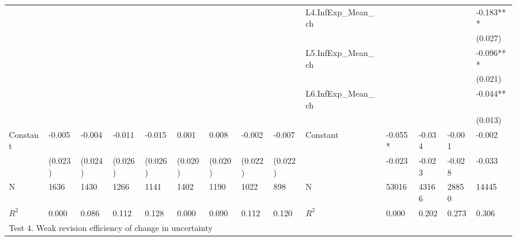\documentclass[]{article}
\begin{document}
\begin{table}
\begin{adjustbox}{width={24cm},totalheight={14cm},angle=90}
\begin{tabular}{llllllllllllll}
				&             &           &           &           &               &           &           &           & L4.InfExp\_Mean\_ch &         &           &           & -0.183*** \\
				
				&             &           &           &           &               &           &           &           &                                 &         &           &           & (0.027)    \\
				&             &           &           &           &               &           &           &           & L5.InfExp\_Mean\_ch &         &           &           & -0.096*** \\
				&             &           &           &           &               &           &           &           &                      &         &           &           & (0.021)    \\
				&             &           &           &           &               &           &           &           & L6.InfExp\_Mean\_ch &         &           &           & -0.044**  \\
				&             &           &           &           &               &           &           &           &                                     &         &           &           & (0.013)    \\
				Constant               & -0.005      & -0.004    & -0.011    & -0.015    & 0.001         & 0.008     & -0.002    & -0.007    & Constant              & -0.055* & -0.034    & -0.001    & -0.002    \\
				& (0.023)     & (0.024)   & (0.026)   & (0.026)   & (0.020)       & (0.020)   & (0.022)   & (0.022)   &                                 & -0.023  & -0.023    & -0.028    & -0.033    \\
				\hline 
				N                    & 1636        & 1430      & 1266      & 1141      & 1402          & 1190      & 1022      & 898       & N                   & 53016   & 43166     & 28850     & 14445     \\
				$R^2$                  & 0.000       & 0.086     & 0.112     & 0.128     & 0.000         & 0.090     & 0.112     & 0.120     & $R^2$ &  0.000       & 0.202     & 0.273     & 0.306   \\
				\hline 
				\multicolumn{14}{l}{Test 4. Weak revision efficiency of change in uncertainty}                \\
				\hline                                                                                                                 

\end{tabular}
\end{adjustbox}
\end{table}
\end{document}
